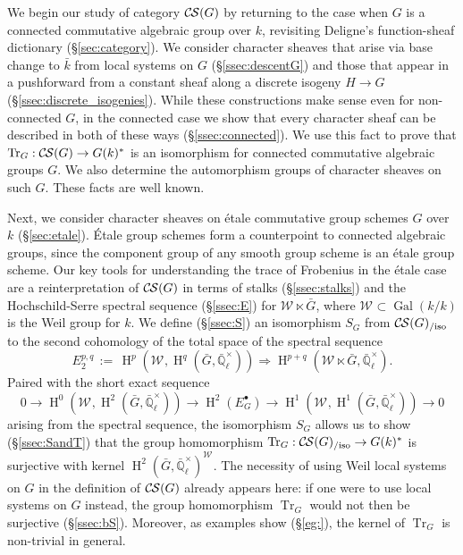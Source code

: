 \documentclass[10pt]{amsart}
\theoremstyle{plain}
\theoremstyle{definition}
\newcommand{\EE}{\mathbb{\bar Q}_\ell}
\newcommand{\bFq}{\bar{k}}
\newcommand{\Fq}{k}
\newcommand{\EEx}{\EE^\times}
\newcommand{\Weil}[1]{\mathcal{W}_{#1}}
\DeclareMathOperator{\Gal}{Gal}
\DeclareMathOperator{\Hh}{H}
\newcommand{\ceq}{{\, :=\, }}
\newcommand{\TrFrob}[1]{\operatorname{Tr}_{#1}}
\newcommand{\gcs}[1]{{\mathcal{\bar #1}}}
\newcommand{\CS}{{\mathcal{C\hskip-0.8pt S}}}
\newcommand{\CSiso}[1]{\CS(#1)_{/\text{iso}}}
\newcommand{\bG}{\bar{G}}
\begin{document}
We begin our study of category $\CS(G)$ by returning to the case when $G$ is a
connected commutative algebraic group over $\Fq$, revisiting Deligne's function-sheaf dictionary (\S\ref{sec:category}).
We consider character sheaves that arise via base change to $\bFq$ from local systems on $G$ (\S\ref{ssec:descentG}) and
those that appear in a pushforward from a constant sheaf along a discrete isogeny $H \to G$ (\S\ref{ssec:discrete_isogenies}).  
While these constructions make sense even for non-connected $G$, in the connected case we show that
every character sheaf can be described in both of these ways (\S\ref{ssec:connected}).  
We use this fact to prove that $\TrFrob{G} : \CS(G) \to G(\Fq)^*$ is an isomorphism for connected commutative algebraic groups $G$.
We also determine the automorphism groups of character sheaves on such $G$. 
These facts are well known.

Next, we consider character sheaves on \'etale commutative group schemes $G$ over $\Fq$ (\S\ref{sec:etale}).
\'Etale group schemes form a counterpoint to connected algebraic groups, since the component group of any
smooth group scheme is an \'etale group scheme.
Our key tools for understanding the trace of Frobenius in the \'etale case 
are a reinterpretation of $\CS(G)$ in terms of stalks (\S\ref{ssec:stalks}) and 
 the Hochschild-Serre spectral sequence (\S\ref{ssec:E}) for $\Weil{} \ltimes \bG$, where $\Weil{} \subset \Gal(\Fq/\Fq)$ is the Weil group for $\Fq$.
We define (\S\ref{ssec:S}) an isomorphism $S_G$ from $\CSiso{G}$ to the second cohomology of the total space of the spectral sequence
\[
E_2^{p,q} \ceq \Hh^p(\Weil{}, \Hh^q(\bG, \EEx)) \Rightarrow \Hh^{p+q}(\Weil{} \ltimes \bG, \EEx).
\]
Paired with the short exact sequence
\[
  0 \to \Hh^0(\Weil{},\Hh^2(\bG,\EEx)) \to \Hh^2(E^\bullet_G) \to \Hh^1(\Weil{},\Hh^1(\bG,\EEx)) \to 0
\]
arising from the spectral sequence, the isomorphism $S_G$ allows us to show (\S\ref{ssec:SandT})
that the group homomorphism $\TrFrob{G}: \CSiso{G} \to G(\Fq)^*$ is surjective with kernel $\Hh^2(\bG,\EEx)^{\Weil{}}$.
The necessity of using Weil local systems on $G$ in the definition of $\CS(G)$ already appears here:
if one were to use local systems on $G$ instead, the group homomorphism $\TrFrob{G}$ would not then be surjective (\S \ref{ssec:bS}). 
Moreover, as examples show (\S \ref{eg:}), the kernel of $\TrFrob{G}$ is non-trivial in general.
\end{document}
